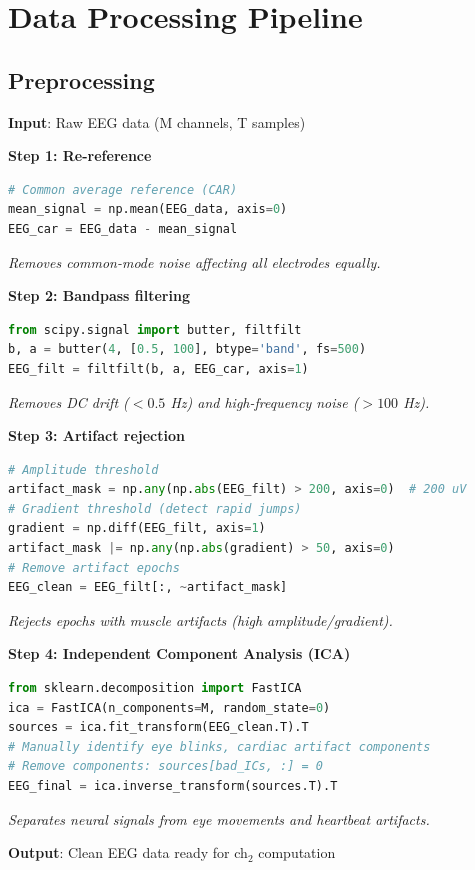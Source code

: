 \section{Data Processing Pipeline}

\subsection{Preprocessing}

\begin{algorithm}\label{alg:preprocess}
\textbf{Input}: Raw EEG data (M channels, T samples)

\textbf{Step 1: Re-reference}
\begin{lstlisting}[language=Python, basicstyle=\ttfamily\small]
# Common average reference (CAR)
mean_signal = np.mean(EEG_data, axis=0)
EEG_car = EEG_data - mean_signal
\end{lstlisting}
\textit{Removes common-mode noise affecting all electrodes equally.}

\textbf{Step 2: Bandpass filtering}
\begin{lstlisting}[language=Python]
from scipy.signal import butter, filtfilt
b, a = butter(4, [0.5, 100], btype='band', fs=500)
EEG_filt = filtfilt(b, a, EEG_car, axis=1)
\end{lstlisting}
\textit{Removes DC drift ($< 0.5$ Hz) and high-frequency noise ($> 100$ Hz).}

\textbf{Step 3: Artifact rejection}
\begin{lstlisting}[language=Python]
# Amplitude threshold
artifact_mask = np.any(np.abs(EEG_filt) > 200, axis=0)  # 200 uV
# Gradient threshold (detect rapid jumps)
gradient = np.diff(EEG_filt, axis=1)
artifact_mask |= np.any(np.abs(gradient) > 50, axis=0)
# Remove artifact epochs
EEG_clean = EEG_filt[:, ~artifact_mask]
\end{lstlisting}
\textit{Rejects epochs with muscle artifacts (high amplitude/gradient).}

\textbf{Step 4: Independent Component Analysis (ICA)}
\begin{lstlisting}[language=Python]
from sklearn.decomposition import FastICA
ica = FastICA(n_components=M, random_state=0)
sources = ica.fit_transform(EEG_clean.T).T
# Manually identify eye blinks, cardiac artifact components
# Remove components: sources[bad_ICs, :] = 0
EEG_final = ica.inverse_transform(sources.T).T
\end{lstlisting}
\textit{Separates neural signals from eye movements and heartbeat artifacts.}

\textbf{Output}: Clean EEG data ready for ch$_2$ computation
\end{algorithm}

